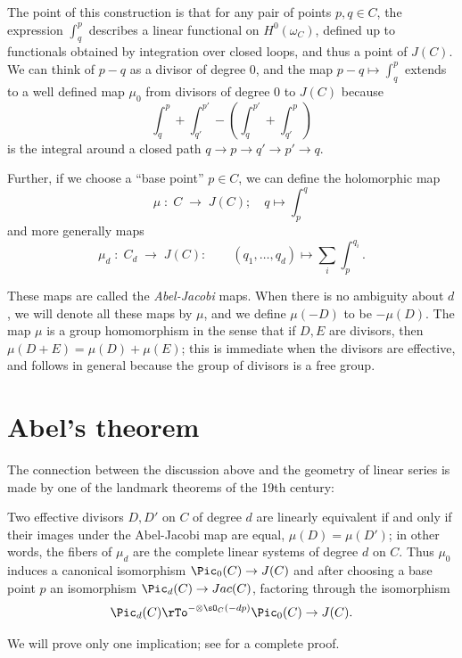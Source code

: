 The point of this construction is that for any pair of points $p, q \in C$, the expression $\int_q^p$ describes a linear functional on $H^0(\omega_C)$, defined up to functionals obtained by integration over closed loops, and thus a point of $J(C)$. We can think of $p-q$ as a divisor of
degree 0, and the map $p-q \mapsto \int_q^p$ extends to a well defined map $\mu_0$ from divisors of degree 0 to $J(C)$ because
$$
\int_q^p +\int_{q'}^{p'} - (\int_q^{p'} +\int_{q'}^p) 
$$
is the integral around a closed path $q\to p\to q'\to p' \to q$.

Further, if we choose a ``base point''  $p\in C$, we can define the holomorphic map
$$
\mu \; : \; C \; \to \; J(C); \quad q\mapsto \int_{p}^{q}
$$
and more generally maps
$$
\mu_d \; : \; C_d \; \to \; J(C): \quad  \quad (q_1,\dots, q_d) \mapsto \sum_i \int_{p}^{q_i}.
$$

These maps are called the \emph{Abel-Jacobi} maps. When there is no ambiguity about $d$, we will denote all these maps  by $\mu$,  and  
we define $\mu(-D)$ to be $-\mu(D)$. 
The map $\mu$ is a group homomorphism in the sense that if $D, E$ are divisors, then
$\mu (D+E) = \mu(D) + \mu(E)$; this is immediate when the divisors are effective, and 
follows in general because the group of divisors is a free group.

\section{Abel's theorem}
 The connection between the discussion above and the geometry of linear series is made by one of the landmark theorems of the 19th century:

\begin{theorem}\label{abel}
Two effective divisors $D, D'$ on $C$ of degree $d$ are linearly equivalent if and only if their images under the Abel-Jacobi map are equal, $\mu(D) = \mu(D')$; in other words, the fibers of $\mu_d$ are the complete linear systems of degree $d$ on $C$. Thus $\mu_0$ induces a canonical isomorphism
$\Pic_0(C) \to J(C)$ and after choosing a base point $p$ an isomorphism $\Pic_d(C) \to Jac(C)$, factoring through the isomorphism
$$
\Pic_d(C) \rTo^{-\otimes \sO_C(-dp)} \Pic_0(C) \to J(C).
$$
\end{theorem}

We will prove only one implication; see \cite[Section 2.2]{Griffiths-Harris1978}  for a complete proof.

